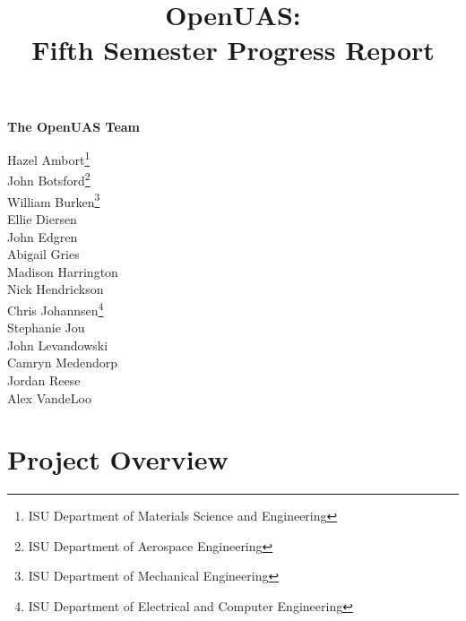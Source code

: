 \documentclass{article}
\title{OpenUAS:\\Fifth Semester Progress Report }
\author{ }
\begin{document}
\maketitle

\newpage

\begin{center}
\Large \textbf{The OpenUAS Team}

\vspace{1cm}

\large{
Hazel Ambort\footnote[1]{ISU Department of Materials Science and Engineering}\\ John Botsford\footnote[2]{ISU Department of Aerospace Engineering}\\ William Burken\footnote[3]{ISU Department of Mechanical Engineering}\\ Ellie Diersen\footnotemark[2]\\ John Edgren\footnotemark[2]\\ Abigail Gries\footnotemark[2]\\ Madison Harrington\footnotemark[1]\\ Nick Hendrickson\footnotemark[2]\\ Chris Johannsen\footnote[4]{ISU Department of Electrical and Computer Engineering}\\ Stephanie Jou\footnotemark[2]\\ John Levandowski\footnotemark[2]\\ Camryn Medendorp\footnotemark[2]\\ Jordan Reese\footnotemark[2]\\  Alex VandeLoo\footnotemark[2] \footnotemark[4]\\
}\par

\end{center}

\newpage


\tableofcontents

\section{Project Overview}
\end{document}
